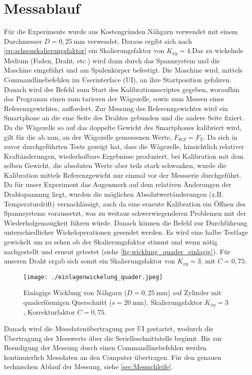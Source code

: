 \section{Messablauf}
\label{sec:Messablauf}

Für die Experimente wurde aus Kostengründen Nähgarn verwendet mit einem Durchmesser $D = 0,25~\si{\milli\metre}$ verwendet. Daraus ergibt sich nach \autoref{eq:achsenskalierungsfaktor} ein Skalierungsfaktor von $K_{xy} = 4$.Das zu wickelnde Medium (Faden, Draht, etc.) wird dann durch das Spannsystem und die Maschine eingeführt und am Spulenkörper befestigt. Die Maschine wird, mittels Commandlinebefehlen im Userinterface (UI), an ihre Startposition gefahren. Danach wird der Befehl zum Start des Kalibrationsscriptes gegeben, woraufhin das Programm einen zum tarieren der Wägezelle, sowie zum Messen eines Referenzgewichtes, auffordert. Zur Messung des Referenzgewichtes wird ein Smartphone an die eine Seite des Drahtes gebunden und die andere Seite fixiert. Da die Wägezelle so auf das doppelte Gewicht des Smartphones kalibriert wird, gilt für die ab nun, an der Wägezelle gemessenen Werte, $F_{WZ} = F_T$. Da sich in zuvor durchgeführten Tests gezeigt hat, dass die Wägezelle, hinsichtlich relativer Kraftänderungen, wiederholbare Ergebnisse produziert, bei Kalibration mit dem selben Gewicht, die absoluten Werte aber teils stark schwanken, wurde die Kalibration mittels Referenzgewicht nur einmal vor der Messserie durchgeführt. Da für unser Experiment das Augenmerk auf dem relativen Änderungen der Drahtspannung liegt, wurden die möglichen Absolutwertänderungen (z.B. Temperaturdrift) vernachlässigt, auch da eine erneute Kalibration ein Öffnen des Spannsystems voraussetzt, was zu weitaus schwerwiegenderen Problemen mit der Wiederholgenauigkeit führen würde.
Danach können die Befehl zur Durchführung unterschiedlicher Wickeloperationen gesendet werden. Es wird eine halbe Testlage gewickelt um zu sehen ob der Skalierungsfaktor stimmt und wenn nötig nachgestellt und erneut getestet (siehe \autoref{fig:wicklung_quader_einlagig}). Für unseren Draht ergab sich somit ein Skalierungsfaktor von $K_{xy} = 3$, mit $C = 0,75$. 
\begin{figure}[H]
    \centering
    \texttt{[image: ./einlagenwickelung\_quader.jpeg]}
    \caption{Einlagige Wicklung von Nähgarn ($D = 0,25~\si{\milli\metre}$) auf Zylinder mit quaderförmigen Querschnitt ($s=20~\si{\milli\metre}$). Skalierungsfaktor $K_{xy} = 3$, Korrekturfaktor $C = 0,75$.}
    \label{fig:wicklung_quader_einlagig}
\end{figure}
Danach wird die  Messdatenübertragung per UI gestartet, wodurch die Übertragung der Messwerte über die Serielleschnittstelle beginnt. Bis zur Beendigung der Messung durch einen Commandlinebefehlen werden kontinuierlich Messdaten an den Computer übertragen. Für den genauen technischen Ablauf der Messung, siehe \autoref{sec:Messschleife}. 



